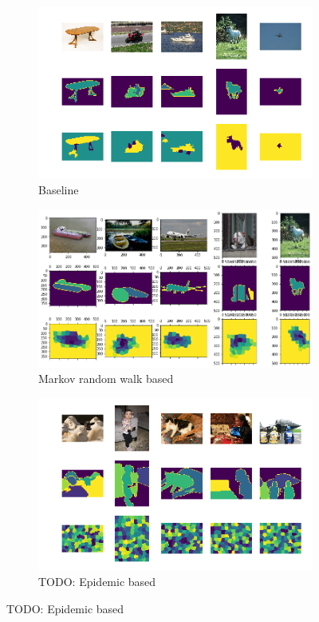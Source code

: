 \documentclass[twocolumn]{article}
\newcommand{\todo}[1]{}
\renewcommand{\todo}[1]{{\color{red} TODO: {#1}}}
\begin{document}
\begin{figure}[t!]
\centering

  \begin{subfigure}{\linewidth}
    \includegraphics[width=\linewidth]{figs/baseline_best.png}
    \caption{Baseline}
  \end{subfigure}

  \begin{subfigure}{\linewidth}
    \includegraphics[width=\linewidth]{figs/markov_best.png}
    \caption{Markov random walk based}
  \end{subfigure}

  \begin{subfigure}{\linewidth}
    \includegraphics[width=\linewidth]{figs/epidemic_best.png}
    \caption{\todo{Epidemic based}}
  \end{subfigure}


\end{figure}
\end{document}
